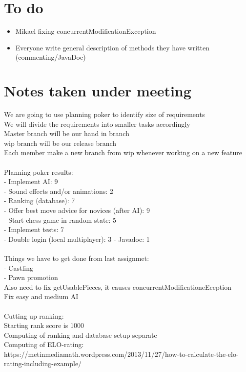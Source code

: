 \documentclass[letterpaper,11pt]{article}
\begin{document}
\section*{To do}
\begin{itemize}
<<<<<<< HEAD
	\item Mikael fixing concurrentModificationException
	\item Everyone write general description of methods they have written (commenting/JavaDoc)
\end{itemize}

\section*{Notes taken under meeting}
We are going to use planning poker to identify size of requirements\\
We will divide the requirements into smaller tasks accordingly\\
Master branch will be our hand in branch\\
wip branch will be our release branch\\
Each member make a new branch from wip whenever working on a new feature\\\\
Planning poker results:\\
- Implement AI: 9\\
- Sound effects and/or animations: 2\\
- Ranking (database): 7\\
- Offer best move advice for novices (after AI): 9\\ 
- Start chess game in random state: 5\\
- Implement tests: 7\\
- Double login (local multiplayer): 3
- Javadoc: 1\\\\
Things we have to get done from last assignmet:\\
- Castling\\
- Pawn promotion\\
Also need to fix getUsablePieces, it causes concurrentModificationeEception\\
Fix easy and medium AI\\\\
Cutting up ranking:\\
Starting rank score is 1000\\
Computing of ranking and database setup separate\\
Computing of ELO-rating: https://metinmediamath.wordpress.com/2013/11/27/how-to-calculate-the-elo-rating-including-example/\\
\end{document}
